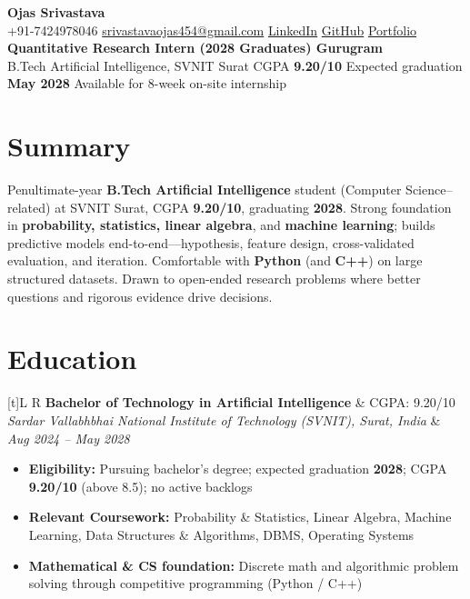 \documentclass[a4paper,10pt]{article}
\newcommand{\resumeSubheading}[4]{%
  \vspace{0.5mm}
  \noindent
  \begin{tabularx}{\textwidth}[t]{L R}
    \textbf{#1} & #4 \\
    \textit{#3} & \textit{#2} \\
  \end{tabularx}
  \vspace{-0.5mm}%
}
\begin{document}
\selectfont

\begin{center}
  {\LARGE \textbf{Ojas Srivastava}} \\[1mm]
  \small
  +91-7424978046 \textbar{}
  \href{mailto:srivastavaojas454@gmail.com}{srivastavaojas454@gmail.com} \textbar{}
  \href{https://linkedin.com/in/ojas-srivastava05}{LinkedIn} \textbar{}
  \href{https://github.com/Ojas-Srivastava05}{GitHub} \textbar{}
  \href{https://ojas-srivastava.vercel.app}{Portfolio} \\[0.5mm]
  \textbf{Quantitative Research Intern (2028 Graduates) \textbar{} Gurugram} \\[0.3mm]
  B.Tech Artificial Intelligence, SVNIT Surat \textbar{}
  CGPA \textbf{9.20/10} \textbar{}
  Expected graduation \textbf{May 2028} \textbar{}
  Available for 8-week on-site internship
\end{center}

\vspace{-1mm}

\section{Summary}
\small
Penultimate-year \textbf{B.Tech Artificial Intelligence} student (Computer Science--related) at SVNIT Surat, CGPA \textbf{9.20/10}, graduating \textbf{2028}. Strong foundation in \textbf{probability, statistics, linear algebra}, and \textbf{machine learning}; builds predictive models end-to-end---hypothesis, feature design, cross-validated evaluation, and iteration. Comfortable with \textbf{Python} (and \textbf{C++}) on large structured datasets. Drawn to open-ended research problems where better questions and rigorous evidence drive decisions.

\section{Education}
\small
\resumeSubheading
  {Bachelor of Technology in Artificial Intelligence}{Aug 2024 -- May 2028}
  {Sardar Vallabhbhai National Institute of Technology (SVNIT), Surat, India}{CGPA: 9.20/10}
\begin{itemize}
  \item \textbf{Eligibility:} Pursuing bachelor's degree; expected graduation \textbf{2028}; CGPA \textbf{9.20/10} (above 8.5); no active backlogs
  \item \textbf{Relevant Coursework:} Probability \& Statistics, Linear Algebra, Machine Learning, Data Structures \& Algorithms, DBMS, Operating Systems
  \item \textbf{Mathematical \& CS foundation:} Discrete math and algorithmic problem solving through competitive programming (Python / C++)
\end{itemize}
\end{document}
